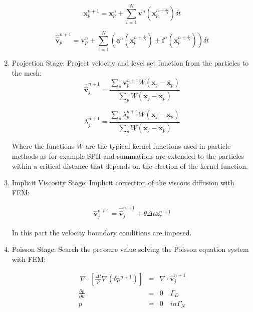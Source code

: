 \begin{enumerate}
\begin{equation}\label{Step2astep}
\mathbf{x}^{n+1}_{p}=\mathbf{x}^{n}_{p} + \sum_{i=1}^{N} \mathbf{v}^{n}(\mathbf{x}^{n+\frac{i}{N}}_{p}) \delta t
\end{equation}

\begin{equation}\label{Step2bstep}
\widehat{\widehat{\mathbf{v}}}^{n+1}_{p}=\mathbf{v}^{n}_{p} + \sum_{i=1}^{N} \left(\mathbf{a}^{n}(\mathbf{x}^{n+\frac{i}{N}}_{p}) + \mathbf{f}^{n} (\mathbf{x}^{n+\frac{i}{N}}_{p})\right)  \delta t
\end{equation}

  \item Projection Stage: Project velocity and level set function from the particles to the mesh:
  \begin{equation}\label{Step3a}
\displaystyle \widehat{\widehat{\mathbf{v}}}^{n+1}_{j}=\frac{\sum_{p} \mathbf{v}^{n+1}_{p} W(\mathbf{x}_{j}-\mathbf{x}_{p})}{\sum_{p} W(\mathbf{x}_{j}-\mathbf{x}_{p})}
\end{equation}

\begin{equation}\label{Step3b}
\displaystyle \lambda^{n+1}_{j}=\frac{\sum_{p} \lambda^{n+1}_{p} W(\mathbf{x}_{j}-\mathbf{x}_{p})}{\sum_{p} W(\mathbf{x}_{j}-\mathbf{x}_{p})}
\end{equation}

Where the functions $W$ are the typical kernel functions used in particle methods as for example SPH \cite{Monaghan} and summations are extended to the particles within a critical distance that depends on the election of the kernel function. 

  \item Implicit Viscosity Stage: Implicit correction of the viscous diffusion with FEM:

 \begin{eqnarray}\label{Step4a}
\displaystyle \widehat{\mathbf{v}}^{n+1}_{j}=\widehat{\widehat{\mathbf{v}}}^{n+1}_{j} + \theta \Delta t \mathbf{a}^{n+1}_{\tau}
\end{eqnarray}

In this part the velocity boundary conditions are imposed. 

 \item Poisson Stage: Search the pressure value solving the Poisson equation system with FEM:

 
 \begin{eqnarray}\label{Step5a}
   \ \nabla \cdot [\frac{\Delta t}{\rho}\nabla(\delta p^{n+1})] &=& \nabla \cdot \widehat{\mathbf{v}}_j^{n+1} \\
   \frac{\partial p}{\partial n} &=& 0 \quad \Gamma_D \\
   p &=& 0 \quad in \Gamma_N \\
 \end{eqnarray}
  


\end{enumerate}
